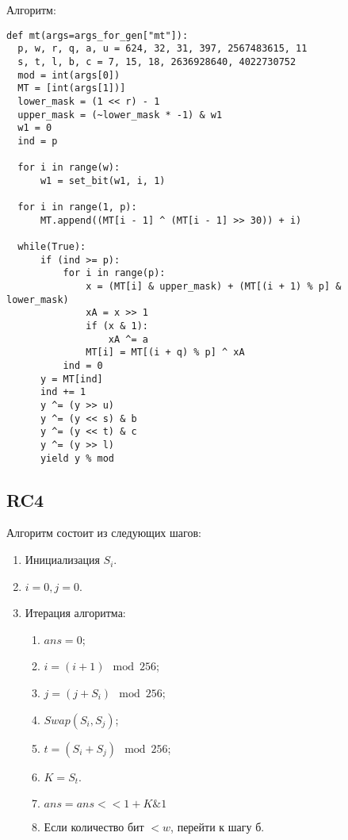 \documentclass[spec, och, labwork]{shiza}
\begin{document}
Алгоритм:
\begin{small}
\begin{verbatim}
def mt(args=args_for_gen["mt"]):
  p, w, r, q, a, u = 624, 32, 31, 397, 2567483615, 11
  s, t, l, b, c = 7, 15, 18, 2636928640, 4022730752
  mod = int(args[0])
  MT = [int(args[1])]
  lower_mask = (1 << r) - 1
  upper_mask = (~lower_mask * -1) & w1
  w1 = 0
  ind = p

  for i in range(w):
      w1 = set_bit(w1, i, 1)

  for i in range(1, p):
      MT.append((MT[i - 1] ^ (MT[i - 1] >> 30)) + i)

  while(True):
      if (ind >= p):
          for i in range(p):
              x = (MT[i] & upper_mask) + (MT[(i + 1) % p] & lower_mask)
              xA = x >> 1
              if (x & 1):
                  xA ^= a
              MT[i] = MT[(i + q) % p] ^ xA
          ind = 0
      y = MT[ind]
      ind += 1
      y ^= (y >> u)
      y ^= (y << s) & b
      y ^= (y << t) & c
      y ^= (y >> l)
      yield y % mod

\end{verbatim}
\end{small}




\subsection{RC4}

Алгоритм состоит из следующих шагов:
\begin{enumerate}
  \item Инициализация $S_i$.
  \item $i = 0, j = 0$.
  \item Итерация алгоритма:
    \begin{enumerate}
      \item $ans = 0$;
      \item $i = (i + 1) \mod 256$;
      \item $j = (j + S_i) \mod 256$;
      \item $Swap(S_i, S_j)$;
      \item $t = (S_i + S_j) \mod 256$;
      \item $K = S_t$.
      \item $ans = ans << 1 + K \& 1$
      \item Если количество бит $< w$, перейти к шагу б.
    \end{enumerate}
\end{enumerate}
\end{document}
